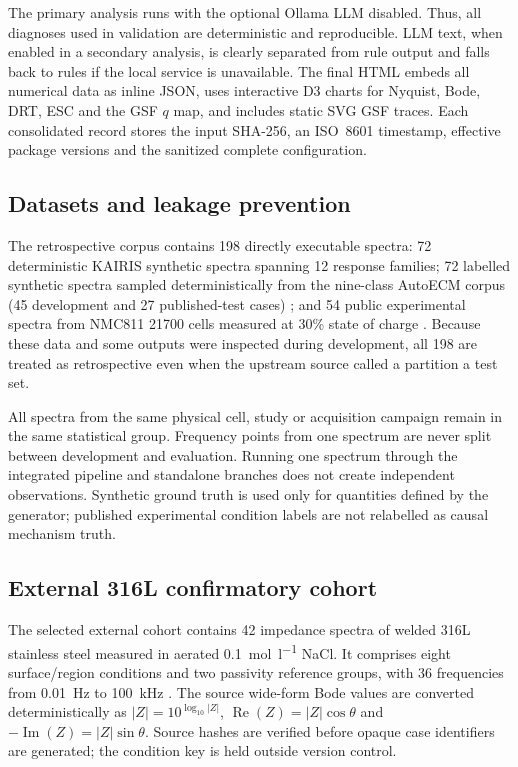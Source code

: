 \documentclass[a4paper,fleqn]{cas-sc}
\begin{document}
The primary analysis runs with the optional Ollama LLM disabled. Thus, all
diagnoses used in validation are deterministic and reproducible. LLM text, when
enabled in a secondary analysis, is clearly separated from rule output and
falls back to rules if the local service is unavailable. The final HTML embeds
all numerical data as inline JSON, uses interactive D3 charts for Nyquist, Bode,
DRT, ESC and the GSF $q$ map, and includes static SVG GSF traces. Each consolidated
record stores the input SHA-256, an ISO~8601 timestamp, effective package
versions and the sanitized complete configuration.

\subsection{Datasets and leakage prevention}\label{sec:datasets}

The retrospective corpus contains 198 directly executable spectra: 72
deterministic KAIRIS synthetic spectra spanning 12 response families; 72 labelled
synthetic spectra sampled deterministically from the nine-class AutoECM corpus
(45 development and 27 published-test cases) \cite{Schaeffer2023AutoECM}; and 54
public experimental spectra from NMC811 21700 cells measured at 30\% state of
charge \cite{Moertelmaier2025Dataset}. Because these data and some outputs were
inspected during development, all 198 are treated as retrospective even when the
upstream source called a partition a test set.

All spectra from the same physical cell, study or acquisition campaign remain in
the same statistical group. Frequency points from one spectrum are never split
between development and evaluation. Running one spectrum through the integrated
pipeline and standalone branches does not create independent observations.
Synthetic ground truth is used only for quantities defined by the generator;
published experimental condition labels are not relabelled as causal mechanism
truth.

\subsection{External 316L confirmatory cohort}\label{sec:external}

The selected external cohort contains 42 impedance spectra of welded 316L
stainless steel measured in aerated \SI{0.1}{\mole\per\litre} NaCl. It comprises
eight surface/region conditions and two passivity reference groups, with 36
frequencies from 0.01~Hz to 100~kHz \cite{Martinez2026Clustering}. The source
wide-form Bode values are converted deterministically as
$|Z|=10^{\log_{10}|Z|}$,
$\operatorname{Re}(Z)=|Z|\cos\theta$ and
$-\operatorname{Im}(Z)=|Z|\sin\theta$. Source hashes are verified before opaque
case identifiers are generated; the condition key is held outside version
control.
\end{document}

